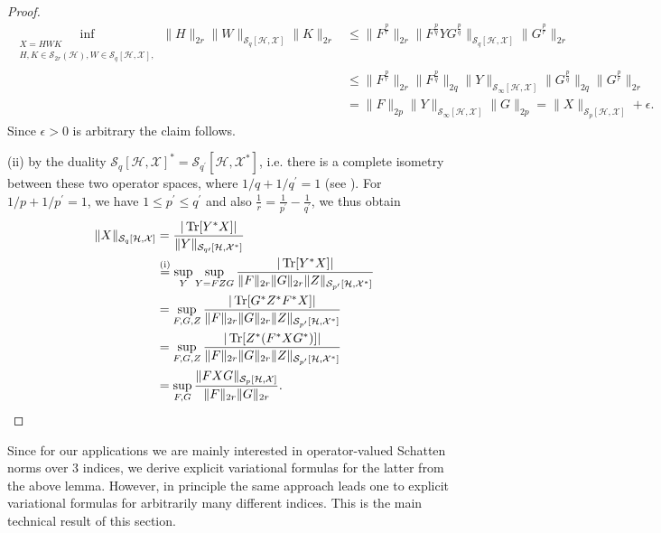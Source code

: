 \documentclass[11pt]{article}
\newcommand{\1}{\ensuremath{\mathbbm{1}}}
\theoremstyle{newdefinition}
\theoremstyle{newplain}
\theoremstyle{myplain}
\begin{document}
\begin{proof}
    \begin{align}
        \inf_{\substack{X=HWK\\H,K\in \mathcal{S}_{2r}(\mathcal{H}), W\in \mathcal{S}_q[\mathcal{H},\mathcal{X}], }}\|H\|_{2r}\|W\|_{\mathcal{S}_q[\mathcal{H},\mathcal{X}]}\|K\|_{2r} &\leq \|F^{\frac{p}{r}}\|_{2r}\|F^{\frac{p}{q}}YG^{\frac{p}{q}}\|_{\mathcal{S}_q[\mathcal{H},\mathcal{X}]}\|G^{\frac{p}{r}}\|_{2r} \\
        &\leq \|F^{\frac{p}{r}}\|_{2r}\|F^{\frac{p}{q}}\|_{2q}\|Y\|_{\mathcal{S}_\infty[\mathcal{H},\mathcal{X}]}\|G^{\frac{p}{q}}\|_{2q}\|G^{\frac{p}{r}}\|_{2r} \\&=\|F\|_{2p}\|Y\|_{\mathcal{S}_\infty[\mathcal{H},\mathcal{X}]} \|G\|_{2p} = \|X\|_{\mathcal{S}_p[\mathcal{H},\mathcal{X}]}+\epsilon.
    \end{align}
    Since $\epsilon>0$ is arbitrary the claim follows.

    \medskip 

   (ii) by the duality $\mathcal{S}_{q}[\mathcal{H},\mathcal{X}]^*=\mathcal{S}_{q^\prime}[\mathcal{H},\mathcal{X}^*]$, i.e. there is a complete isometry between these two operator spaces, where $1/q+1/q^\prime=1$ (see \cite[Proposition 4.3]{Beigi.2023}). For $1/p + 1/p^\prime = 1$, we have $1 \leq p^\prime \leq q^\prime$ and also $\frac{1}{r} = \frac{1}{p^\prime} - \frac{1}{q^\prime}$, we thus obtain
    \begin{align}
    \|X\|_{\mathcal{S}_q[\mathcal{H},\mathcal{X}]}
        &=\frac{|\Tr[Y^*X]|}{\|Y\|_{\mathcal{S}_{q\prime}[\mathcal{H},\mathcal{X}^*]}}\\
        &\overset{\operatorname{(i)}}{=} \sup_Y\sup_{ Y = FZG}\frac{|\Tr[Y^*X]|}{\|F\|_{2r}\|G\|_{2r}\|Z\|_{\mathcal{S}_{p^\prime}[\mathcal{H},\mathcal{X}^*]}} \\ &=\sup_{F,G,Z}\frac{|\Tr[G^*Z^*F^*X]|}{\|F\|_{2r}\|G\|_{2r}\|Z\|_{\mathcal{S}_{p^\prime}[\mathcal{H},\mathcal{X}^*]}}\\
        &=\sup_{F,G,Z}\frac{|\Tr[Z^*(F^*XG^*)]|}{\|F\|_{2r}\|G\|_{2r}\|Z\|_{\mathcal{S}_{p^\prime}[\mathcal{H},\mathcal{X}^*]}}\\
&=\sup_{F,G}\frac{\|FXG\|_{\mathcal{S}_p[\mathcal{H},\mathcal{X}]}}{\|F\|_{2r}\|G\|_{2r}}.
    \end{align}
\end{proof}
Since for our applications we are mainly interested in operator-valued Schatten norms over $3$ indices, we derive explicit variational formulas for the latter from the above lemma. However, in principle the same approach leads one to explicit variational formulas for arbitrarily many different indices. This is the main technical result of this section.
\end{document}
